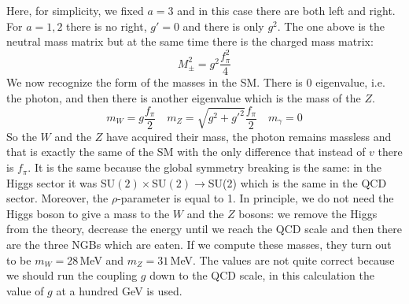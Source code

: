 \documentclass[../main.tex]{subfiles}
\begin{document}
Here, for simplicity, we fixed $a=3$ and in this case there are both left and right. For $a=1,2$ there is no right, $g'=0$ and there is only $g^2$. The one above is the neutral mass matrix but at the same time there is the charged mass matrix:
\[
M_\pm^2=g^2\frac{f_\pi^2}{4}
\]
We now recognize the form of the masses in the SM. There is 0 eigenvalue, i.e. the photon, and then there is another eigenvalue which is the mass of the $Z$.
\[
m_W=g\frac{f_\pi}{2} \quad m_Z=\sqrt{g^2+g'^2}\frac{f_\pi}{2} \quad m_\gamma=0
\]
So the $W$ and the $Z$ have acquired their mass, the photon remains massless and that is exactly the same of the SM with the only difference that instead of $v$ there is $f_\pi$. It is the same because the global symmetry breaking is the same: in the Higgs sector it was SU$(2)\times$SU$(2)\to$SU(2) which is the same in the QCD sector. Moreover, the $\rho$-parameter is equal to 1. In principle, we do not need the Higgs boson to give a mass to the $W$ and the $Z$ bosons: we remove the Higgs from the theory, decrease the energy until we reach the QCD scale and then there are the three NGBs which are eaten. If we compute these masses, they turn out to be $m_W=28$\,MeV and $m_Z=31$\,MeV. The values are not quite correct because we should run the coupling $g$ down to the QCD scale, in this calculation the value of $g$ at a hundred GeV is used.
\end{document}
